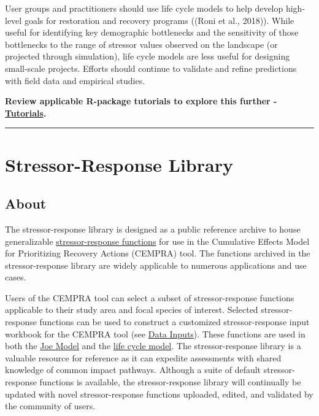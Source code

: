\documentclass[
  letterpaper,
  DIV=11,
  numbers=noendperiod]{scrreprt}
\begin{document}
User groups and practitioners should use life cycle models to help
develop high-level goals for restoration and recovery programs ((Roni et
al., 2018)). While useful for identifying key demographic bottlenecks
and the sensitivity of those bottlenecks to the range of stressor values
observed on the landscape (or projected through simulation), life cycle
models are less useful for designing small-scale projects. Efforts
should continue to validate and refine predictions with field data and
empirical studies.

\textbf{Review applicable R-package tutorials to explore this further -
\href{https://essatech.github.io/CEMPRA/index.html}{Tutorials}.}

\begin{center}\rule{0.5\linewidth}{0.5pt}\end{center}


\chapter{Stressor-Response Library}\label{sec-stressor-response-library}

\section{About}\label{08_stressor_response_library-sec-about}

The stressor-response library is designed as a public reference archive
to house generalizable
\hyperref[stressor-response-functions]{stressor-response functions} for
use in the Cumulative Effects Model for Prioritizing Recovery Actions
(CEMPRA) tool. The functions archived in the stressor-response library
are widely applicable to numerous applications and use cases.

Users of the CEMPRA tool can select a subset of stressor-response
functions applicable to their study area and focal species of interest.
Selected stressor-response functions can be used to construct a
customized stressor-response input workbook for the CEMPRA tool (see
\hyperref[data-inputs]{Data Inputs}). These functions are used in both
the \hyperref[modelling-pathways-and-assessment-endpoints]{Joe Model}
and the \hyperref[life-cycle-model-population-model-overview]{life cycle
model}. The stressor-response library is a valuable resource for
reference as it can expedite assessments with shared knowledge of common
impact pathways. Although a suite of default stressor-response functions
is available, the stressor-response library will continually be updated
with novel stressor-response functions uploaded, edited, and validated
by the community of users.
\end{document}
